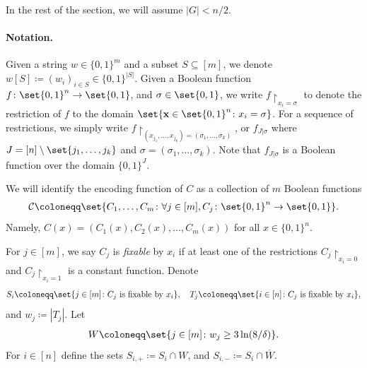 \documentclass[10pt,a4paper]{article}
\theoremstyle{remark}
\newcommand{\zo}{\ensuremath{{\{0,1\}}}\xspace}
\def\*#1{\mathbf{#1}}
\def\+#1{\mathcal{#1}}
\newcommand{\authnote}[3]{\textcolor{#2}{{\sf (#1's Note: {\sl{#3}})}}}
\newcommand{\xnote}{\authnote{Xin}{magenta}}
\newcommand{\authnote}{}
\newcommand{\xnote}[1]{}
\begin{document}
In the rest of the section, we will assume $|G| < n/2$. 
\fi

\paragraph{Notation.} Given a string $w \in \zo^m$ and a subset $S\subseteq [m]$, we denote $w[S]\coloneqq (w_i)_{i\in S} \in \zo^{|S|}$. Given a Boolean function $f \colon \set{0,1}^{n} \rightarrow \set{0,1}$, and $\sigma \in \set{0,1}$, we write $f\restriction_{x_i = \sigma}$ to denote the restriction of $f$ to the domain $\set{\*x \in \set{0,1}^n \colon x_i = \sigma}$. For a sequence of restrictions, we simply write $f\restriction_{(x_{j_1}, \dots, x_{j_k})=(\sigma_1,\dots,\sigma_k)}$, or $f_{J|\sigma}$ where $J=[n]\setminus\set{j_1,\dots,j_k}$ and $\sigma=(\sigma_1,\dots,\sigma_k)$. Note that $f_{J|\sigma}$ is a Boolean function over the domain $\zo^{J}$. 

We will identify the encoding function of $C$ as a collection of $m$ Boolean functions
\begin{align*} 
\+C \coloneqq \set{C_1, \dots, C_m \colon \forall j \in [m], C_j \colon \set{0,1}^n \rightarrow \set{0,1}}.
\end{align*}
Namely, $C(x)=(C_1(x), C_2(x), \dots, C_m(x))$ for all $x \in \zo^n$.

For $j \in [m]$, we say $C_j$ is \emph{fixable} by $x_i$ if at least one of the restrictions $C_j\restriction_{x_i=0}$ and $C_j\restriction_{x_i=1}$ is a constant function. Denote
\begin{align*}
S_i \coloneqq \set{j \in [m] \colon C_j\textup{ is fixable by }x_i}, \quad T_j \coloneqq \set{i \in [n] \colon C_j\textup{ is fixable by }x_i},
\end{align*}
and $w_{j} \coloneqq |T_j|$. Let 
\begin{align*}
W \coloneqq \set{j \in [m] \colon w_{j} \ge 3\ln(8/\delta) }.
\end{align*}
For $i \in [n]$ define the sets $S_{i,+} \coloneqq S_{i} \cap W$, and $S_{i,-} \coloneqq S_i \cap \overline{W}$.
\end{document}
